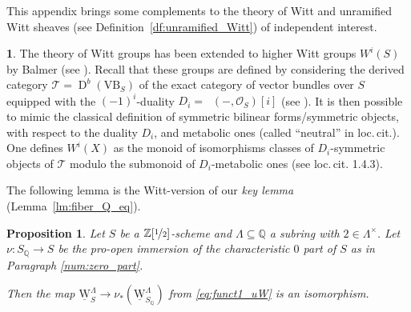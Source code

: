 \documentclass[JEP,XML,SOM,Unicode]{cedram}
\newcommand{\T}{\mathscr T}
\newcommand{\uW}{\underline{\mathrm W}}
\DeclareMathOperator{\uHom}{\underline{Hom}}
\DeclareMathOperator{\Der}{D}
\newcommand{\ZZot} {\mathbb Z[\nicefrac 1 2]}
\newcommand{\QQ} {\mathbb Q}
\newtheorem{prop}[thm]{Proposition}
\theoremstyle{remark}
\theoremstyle{definition}
\newtheorem{num}[thm]{}
\numberwithin{equation}{thm}
\begin{document}
This appendix brings some complements to the theory of Witt and unramified Witt sheaves
(see Definition~\ref{df:unramified_Witt}) of independent interest.

\begin{num}\label{num:Balmer}
The theory of Witt groups has been extended to
higher Witt groups $W^i(S)$ by Balmer (see \eg \cite{BalmerBasic}).
Recall that these groups are defined by considering the deri\-ved category
$\T=\Der^b(\mathrm{VB}_S)$ of the exact category of vector bundles over $S$
equipped with the $(-1)^i$-duality $D_i=\uHom(-,\mathcal O_S)[i]$
(see \cite[1.4.12]{BalmerBasic}).
It is then possible to mimic the classical definition of
symmetric bilinear forms/symmetric objects, with respect to the duality $D_i$, and metabolic ones (called ``neutral'' in loc.\,cit.).
One defines $W^i(X)$ as the monoid of isomorphisms classes of
$D_i$-symmetric objects of $\T$ modulo the submonoid of $D_i$-metabolic ones (see loc.\,cit. 1.4.3).

The following lemma is the Witt-version of our \emph{key lemma} (Lemma~\ref{lm:fiber_Q_eq}).
\end{num}
\begin{prop}\label{prop:Witt_2inverted}
Let $S$ be a $\ZZot$-scheme and $\Lambda \subseteq \QQ$ a subring with $2 \in \Lambda^\times$.
Let $\nu:S_\QQ \to S$ be the pro-open immersion of the characteristic $0$ part of $S$
as in Paragraph \ref{num:zero_part}.

Then the map $\uW_S^\Lambda \to \nu_*(\uW_{S_\QQ}^\Lambda)$ from \eqref{eq:funct1_uW} is an isomorphism.
\end{prop}
\end{document}
